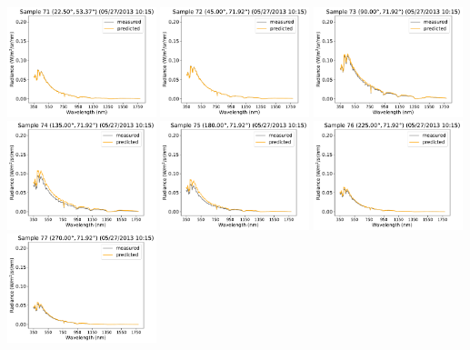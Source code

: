 \begin{center}
\includegraphics[width=0.325\textwidth]{img/05271015_s71.pdf}
\includegraphics[width=0.325\textwidth]{img/05271015_s72.pdf}
\includegraphics[width=0.325\textwidth]{img/05271015_s73.pdf}\\
\includegraphics[width=0.325\textwidth]{img/05271015_s74.pdf}
\includegraphics[width=0.325\textwidth]{img/05271015_s75.pdf}
\includegraphics[width=0.325\textwidth]{img/05271015_s76.pdf}\\
\includegraphics[width=0.325\textwidth]{img/05271015_s77.pdf}

\end{center}

